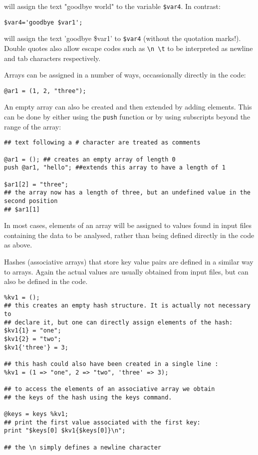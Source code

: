 \documentclass[11pt]{article}
\begin{document}
will assign the text "goodbye world" to the variable \texttt{\$var4}.
In contrast:

\begin{verbatim}
$var4='goodbye $var1';
\end{verbatim}

will assign the text 'goodbye \$var1' to \texttt{\$var4} (without the quotation
marks!).
Double quotes also allow escape codes such as \texttt{\textbackslash{}n \textbackslash{}t} to be interpreted
as newline and tab characters respectively.

Arrays can be assigned in a number of ways, occassionally directly in
the code:

\begin{verbatim}
@ar1 = (1, 2, "three");
\end{verbatim}

An empty array can also be created and then extended by adding elements.
This can be done by either using the \texttt{push} function or by using
subscripts beyond the range of the array:

\begin{verbatim}
## text following a # character are treated as comments

@ar1 = (); ## creates an empty array of length 0 
push @ar1, "hello"; ##extends this array to have a length of 1

$ar1[2] = "three"; 
## the array now has a length of three, but an undefined value in the second position 
## $ar1[1]
\end{verbatim}

In most cases, elements of an array will be assigned to values found in
input files containing the data to be analysed, rather than being
defined directly in the code as above.

Hashes (associative arrays) that store key value pairs are defined in a
similar way to arrays. Again the actual values are usually obtained from
input files, but can also be defined in the code.

\begin{verbatim}
%kv1 = ();
## this creates an empty hash structure. It is actually not necessary to
## declare it, but one can directly assign elements of the hash:
$kv1{1} = "one";
$kv1{2} = "two";
$kv1{'three'} = 3;

## this hash could also have been created in a single line :
%kv1 = (1 => "one", 2 => "two", 'three' => 3);

## to access the elements of an associative array we obtain
## the keys of the hash using the keys command.

@keys = keys %kv1;
## print the first value associated with the first key:
print "$keys[0] $kv1{$keys[0]}\n";

## the \n simply defines a newline character
\end{verbatim}
\end{document}
